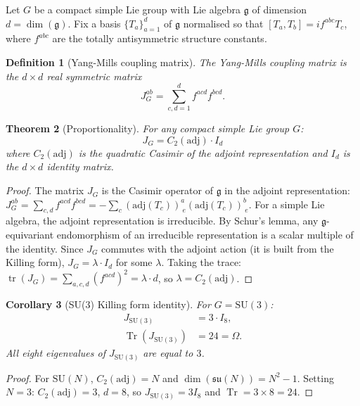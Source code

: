 \documentclass[11pt,a4paper]{article}
\theoremstyle{plain}
\newtheorem{theorem}{Theorem}[section]
\newtheorem{corollary}[theorem]{Corollary}
\newtheorem{definition}[theorem]{Definition}
\theoremstyle{remark}
\renewcommand{\Omega}{\varOmega}
\newcommand{\Tr}{\operatorname{Tr}}
\newcommand{\tr}{\operatorname{tr}}
\newcommand{\SU}{\mathrm{SU}}
\newcommand{\adj}{\mathrm{adj}}
\begin{document}
Let $G$ be a compact simple Lie group with Lie algebra $\mathfrak{g}$ of
dimension $d = \dim(\mathfrak{g})$. Fix a basis $\{T_a\}_{a=1}^d$ of
$\mathfrak{g}$ normalised so that $[T_a, T_b] = i f^{abc} T_c$, where
$f^{abc}$ are the totally antisymmetric structure constants.

\begin{definition}[Yang-Mills coupling matrix]
\label{def:JYM}
The \emph{Yang-Mills coupling matrix} is the $d \times d$ real symmetric
matrix
\[
  J_G^{ab} = \sum_{c,d=1}^d f^{acd} f^{bcd}.
\]
\end{definition}

\begin{theorem}[Proportionality]
\label{thm:proportionality}
For any compact simple Lie group $G$:
\[
  J_G = C_2(\adj) \cdot I_d
\]
where $C_2(\adj)$ is the quadratic Casimir of the adjoint representation and
$I_d$ is the $d \times d$ identity matrix.
\end{theorem}

\begin{proof}
The matrix $J_G$ is the Casimir operator of $\mathfrak{g}$ in the adjoint
representation: $J_G^{ab} = \sum_{c,d} f^{acd} f^{bcd} =
-\sum_c (\adj(T_c))^a_{\ e} (\adj(T_c))^b_{\ e}$. For a simple Lie algebra,
the adjoint representation is irreducible. By Schur's lemma, any
$\mathfrak{g}$-equivariant endomorphism of an irreducible representation is
a scalar multiple of the identity. Since $J_G$ commutes with the adjoint
action (it is built from the Killing form), $J_G = \lambda \cdot I_d$ for
some $\lambda$. Taking the trace: $\tr(J_G) = \sum_{a,c,d} (f^{acd})^2 =
\lambda \cdot d$, so $\lambda = C_2(\adj)$.
\end{proof}

\begin{corollary}[SU(3) Killing form identity]
\label{cor:su3}
For $G = \SU(3)$:
\begin{align}
  J_{\SU(3)} &= 3 \cdot I_8, \label{eq:Jsu3} \\
  \Tr(J_{\SU(3)}) &= 24 = \Omega. \label{eq:trace24}
\end{align}
All eight eigenvalues of $J_{\SU(3)}$ are equal to $3$.
\end{corollary}

\begin{proof}
For $\SU(N)$, $C_2(\adj) = N$ and $\dim(\mathfrak{su}(N)) = N^2 - 1$.
Setting $N = 3$: $C_2(\adj) = 3$, $d = 8$, so $J_{\SU(3)} = 3 I_8$ and
$\Tr = 3 \times 8 = 24$.
\end{proof}
\end{document}
